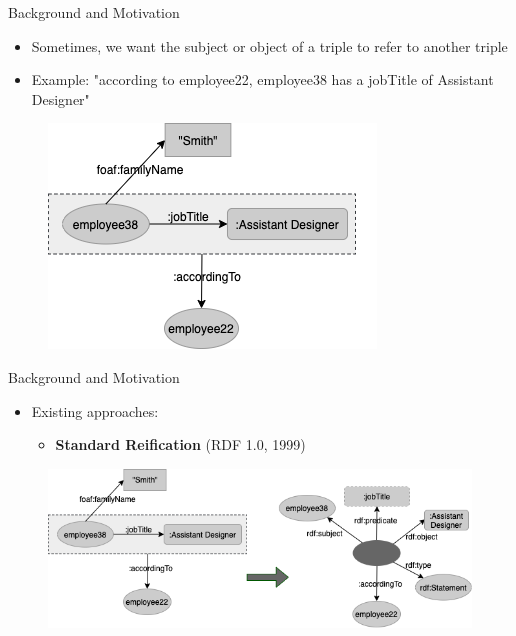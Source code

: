 \documentclass[aspectratio=169]{beamer}
\begin{document}
\begin{frame}{Background and Motivation}
    \begin{itemize}
        \item Sometimes, we want the subject or object of a triple to refer to another triple
        \item Example: "according to employee22, employee38 has a jobTitle of Assistant Designer"
    \end{itemize}
    \begin{figure}
        \centering
        \includegraphics[scale=0.5]{images/Example-2.png}
    \end{figure}
\end{frame}

\begin{frame}{Background and Motivation}
    \begin{itemize}
        \item Existing approaches:
        \begin{itemize}
            \item \textbf{Standard Reification} (RDF 1.0, 1999)
        \end{itemize}
    \end{itemize}
    \begin{figure}
        \centering
        \includegraphics[scale=0.5]{images/Example-2-To-Reification.png}
    \end{figure}
\end{frame}
\end{document}

